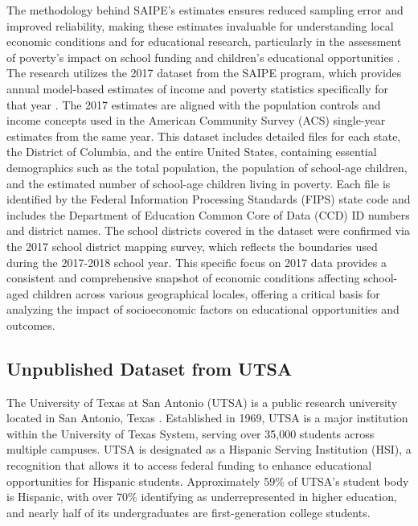 \documentclass[sn-mathphys-num]{sn-jnl}%
\theoremstyle{thmstyleone}%
\theoremstyle{thmstyletwo}%
\theoremstyle{thmstylethree}%
\begin{document}
The methodology behind SAIPE's estimates ensures reduced sampling error and improved reliability, making these estimates invaluable for understanding local economic conditions and for educational research, particularly in the assessment of poverty's impact on school funding and children's educational opportunities \cite{saipe_about}.\\

The research utilizes the 2017 dataset from the SAIPE program, which provides annual model-based estimates of income and poverty statistics specifically for that year \cite{saipe_2017_school_districts}. The 2017 estimates are aligned with the population controls and income concepts used in the American Community Survey (ACS) single-year estimates from the same year. This dataset includes detailed files for each state, the District of Columbia, and the entire United States, containing essential demographics such as the total population, the population of school-age children, and the estimated number of school-age children living in poverty. Each file is identified by the Federal Information Processing Standards (FIPS) state code and includes the Department of Education Common Core of Data (CCD) ID numbers and district names. The school districts covered in the dataset were confirmed via the 2017 school district mapping survey, which reflects the boundaries used during the 2017-2018 school year. This specific focus on 2017 data provides a consistent and comprehensive snapshot of economic conditions affecting school-aged children across various geographical locales, offering a critical basis for analyzing the impact of socioeconomic factors on educational opportunities and outcomes.\\

\subsection{Unpublished Dataset from UTSA}
The University of Texas at San Antonio (UTSA) is a public research university located in San Antonio, Texas \cite{utsa_about}. Established in 1969, UTSA is a major institution within the University of Texas System, serving over 35,000 students across multiple campuses. UTSA is designated as a Hispanic Serving Institution (HSI), a recognition that allows it to access federal funding to enhance educational opportunities for Hispanic students. Approximately 59\% of UTSA’s student body is Hispanic, with over 70\% identifying as underrepresented in higher education, and nearly half of its undergraduates are first-generation college students. %
\end{document}
